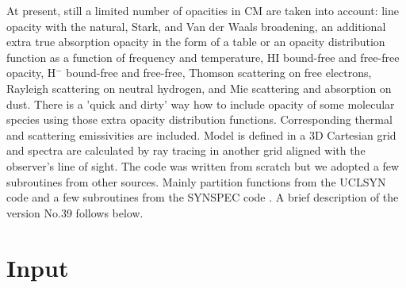\documentclass[11pt,twoside]{article}
\begin{document}
At present, still a limited number of opacities in CM are taken into
account: line opacity with the natural, Stark, and Van der Waals 
broadening, an additional extra true absorption opacity
in the form of a table or an opacity distribution function as
a function of frequency and temperature,
HI bound-free and free-free opacity, H$^{-}$ bound-free and free-free,
Thomson scattering on free electrons, Rayleigh scattering on neutral
hydrogen, and Mie scattering and absorption on dust.
There is a 'quick and dirty' way how to include opacity of some
molecular species using those extra opacity distribution functions.
Corresponding thermal and scattering emissivities are included.
Model is defined in a 3D Cartesian grid and spectra are calculated
by ray tracing in another grid aligned with the observer's line of sight.
The code was written from scratch but we adopted a few subroutines
from other sources. Mainly partition functions
from the UCLSYN code \citep{smith88} and a few subroutines from 
the SYNSPEC code \citep{hubeny17}.
A brief description of the version No.39 follows below.


\section{Input}
\end{document}
